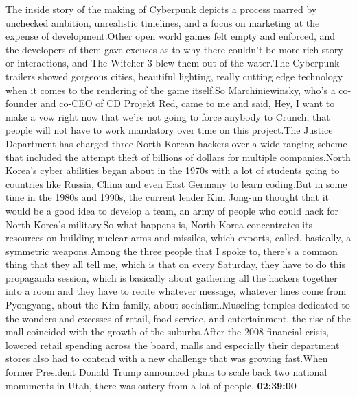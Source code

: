 \documentclass{article}%
\begin{document}
The inside story of the making of Cyberpunk depicts a process marred by unchecked ambition, unrealistic timelines, and a focus on marketing at the expense of development.Other open world games felt empty and enforced, and the developers of them gave excuses as to why there couldn't be more rich story or interactions, and The Witcher 3 blew them out of the water.The Cyberpunk trailers showed gorgeous cities, beautiful lighting, really cutting edge technology when it comes to the rendering of the game itself.So Marchiniewinsky, who's a co{-}founder and co{-}CEO of CD Projekt Red, came to me and said, Hey, I want to make a vow right now that we're not going to force anybody to Crunch, that people will not have to work mandatory over time on this project.The Justice Department has charged three North Korean hackers over a wide ranging scheme that included the attempt theft of billions of dollars for multiple companies.North Korea's cyber abilities began about in the 1970s with a lot of students going to countries like Russia, China and even East Germany to learn coding.But in some time in the 1980s and 1990s, the current leader Kim Jong{-}un thought that it would be a good idea to develop a team, an army of people who could hack for North Korea's military.So what happens is, North Korea concentrates its resources on building nuclear arms and missiles, which exports, called, basically, a symmetric weapons.Among the three people that I spoke to, there's a common thing that they all tell me, which is that on every Saturday, they have to do this propaganda session, which is basically about gathering all the hackers together into a room and they have to recite whatever message, whatever lines come from Pyongyang, about the Kim family, about socialism.Muscling temples dedicated to the wonders and excesses of retail, food service, and entertainment, the rise of the mall coincided with the growth of the suburbs.After the 2008 financial crisis, lowered retail spending across the board, malls and especially their department stores also had to contend with a new challenge that was growing fast.When former President Donald Trump announced plans to scale back two national monuments in Utah, there was outcry from a lot of people.%
\textbf{02:39:00}%
\end{document}
